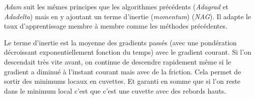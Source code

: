 \documentclass[french]{article}
\begin{document}
	\emph{Adam} suit les mêmes principes que les algorithmes précédents (\emph{Adagrad} et \emph{Adadelta}) mais en y ajoutant un terme d'inertie (\emph{momentum}) (\emph{NAG}). Il adapte le taux d'apprentissage membre à membre comme les méthodes précédentes.
	
	Le terme d'inertie est la moyenne des gradients passés (avec une pondération décroissant exponentiellement fonction du temps) avec le gradient courant. Si l'on descendait très vite avant, on continue de descendre rapidement même si le gradient a diminué à l'instant courant mais avec de la friction. Cela permet de sortir des minimums locaux en cuvettes. Et garanti en somme que si l'on reste dans le minimum local c'est que c'est une cuvette avec des rebords hauts.	
	
\end{document}
